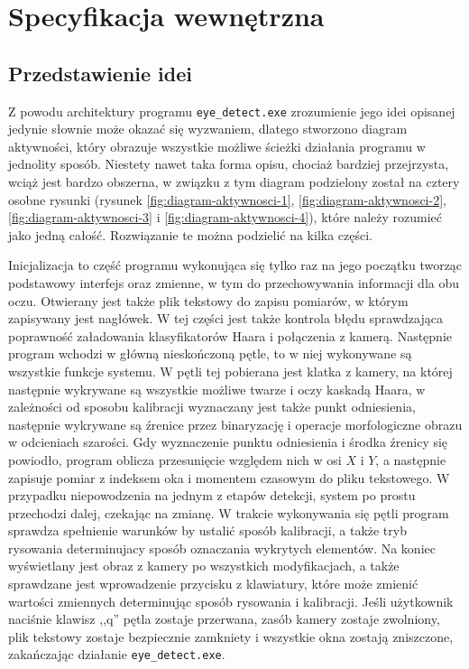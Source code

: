 \documentclass[a4paper,twoside,12pt]{book}
\begin{document}
%
%
%
\chapter{Specyfikacja wewnętrzna}
\label{ch:Specyfikacja-wewnetrzna}

\section{Przedstawienie idei}
\label{sec:Przedstawienie-idei}

Z powodu architektury programu \texttt{eye\-\_detect.exe} zrozumienie jego idei opisanej jedynie słownie może okazać się wyzwaniem, dlatego stworzono diagram aktywności, który obrazuje wszystkie możliwe ścieżki działania programu w jednolity sposób. Niestety nawet taka forma opisu, chociaż bardziej przejrzysta, wciąż jest bardzo obszerna, w związku z tym diagram podzielony został na cztery osobne rysunki (rysunek \ref{fig:diagram-aktywnosci-1}, \ref{fig:diagram-aktywnosci-2}, \ref{fig:diagram-aktywnosci-3} i \ref{fig:diagram-aktywnosci-4}), które należy rozumieć jako jedną całość. Rozwiązanie te można podzielić na kilka części. 

Inicjalizacja to część programu wykonująca się tylko raz na jego początku tworząc podstawowy interfejs oraz zmienne, w tym do przechowywania informacji dla obu oczu. Otwierany jest także plik tekstowy do zapisu pomiarów, w którym zapisywany jest nagłówek. W tej części jest także kontrola błędu sprawdzająca poprawność załadowania klasyfikatorów Haara i połączenia z kamerą. Następnie program wchodzi w główną nieskończoną pętle, to w niej wykonywane są wszystkie funkcje systemu. W pętli tej pobierana jest klatka z kamery, na której następnie wykrywane są wszystkie możliwe twarze i oczy kaskadą Haara, w zależności od sposobu kalibracji wyznaczany jest także punkt odniesienia, następnie wykrywane są źrenice przez binaryzację i operacje morfologiczne obrazu w odcieniach szarości. Gdy wyznaczenie punktu odniesienia i środka źrenicy się powiodło, program oblicza przesunięcie względem nich w osi $X$ i $Y$, a następnie zapisuje pomiar z indeksem oka i momentem czasowym do pliku tekstowego. W przypadku niepowodzenia na jednym z etapów detekcji, system po prostu przechodzi dalej, czekając na zmianę. W trakcie wykonywania się pętli program sprawdza spełnienie warunków by ustalić sposób kalibracji, a także tryb rysowania determinujacy sposób oznaczania wykrytych elementów. Na koniec wyświetlany jest obraz z kamery po wszystkich modyfikacjach, a także sprawdzane jest wprowadzenie przycisku z klawiatury, które może zmienić wartości zmiennych determinując sposób rysowania i kalibracji. Jeśli użytkownik naciśnie klawisz ,,q'' pętla zostaje przerwana, zasób kamery zostaje zwolniony, plik tekstowy zostaje bezpiecznie zamkniety i wszystkie okna zostają zniszczone, zakańczając działanie \texttt{eye\-\_detect.exe}. 
\end{document}
